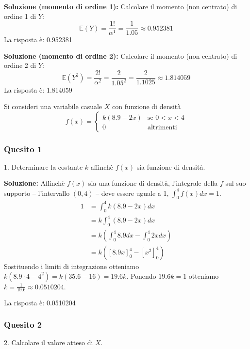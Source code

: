\documentclass[12pt, a4paper]{article}
\begin{document}
\textbf{Soluzione (momento di ordine 1):}
Calcolare il momento (non centrato) di ordine 1 di $Y$:
$$ \mathbb{E}(Y) = \frac{1!}{\alpha^1} = \frac{1}{1.05} \approx 0.952381 $$
La risposta è: 0.952381

\textbf{Soluzione (momento di ordine 2):}
Calcolare il momento (non centrato) di ordine 2 di $Y$:
$$ \mathbb{E}(Y^2) = \frac{2!}{\alpha^2} = \frac{2}{1.05^2} = \frac{2}{1.1025} \approx 1.814059 $$
La risposta è: 1.814059


\vspace{0.5cm}
\begin{tcolorbox}[colback=lightergray!10, colframe=tocsec, title=\textbf{Esercizio 9}]
Si consideri una variabile casuale $X$ con funzione di densità 
$$ f(x) = \begin{cases} k(8.9 - 2x) & \text{se } 0 < x < 4 \\ 0 & \text{altrimenti} \end{cases} $$
\end{tcolorbox}

\subsubsection*{Quesito 1}
1. Determinare la costante $k$ affinchè $f(x)$ sia funzione di densità.

\textbf{Soluzione:}
Affinchè $f(x)$ sia una funzione di densità, l’integrale della $f$ sul suo supporto – l’intervallo $(0,4)$ – deve essere uguale a 1, $\int_0^4 f(x) dx = 1$.
$$ \begin{aligned} 1 &= \int_0^4 k(8.9 - 2x) dx \\ &= k \int_0^4 (8.9 - 2x) dx \\ &= k \left( \int_0^4 8.9 dx - \int_0^4 2x dx \right) \\ &= k \left( \left[ 8.9x \right]_0^4 - \left[ x^2 \right]_0^4 \right) \end{aligned} $$
Sostituendo i limiti di integrazione otteniamo $k(8.9 \cdot 4 - 4^2) = k(35.6 - 16) = 19.6k$.
Ponendo $19.6k = 1$ otteniamo $k = \frac{1}{19.6} \approx 0.0510204$.

La risposta è: 0.0510204

\subsubsection*{Quesito 2}
2. Calcolare il valore atteso di $X$.
\end{document}
